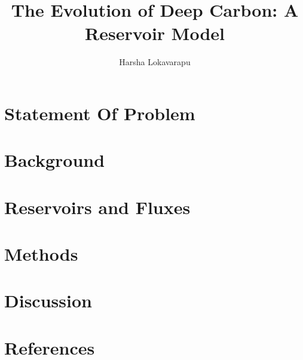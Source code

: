 \documentclass[review]{elsarticle}
\begin{document}
\begin{frontmatter}
\title{\textbf{The Evolution of Deep Carbon: A Reservoir Model}}
\address[address1]{Department of Earth and Planetary Sciences, University of California, Davis, CA 95616, USA}

\author[address1]{Harsha Lokavarapu }

\date{}
\begin{abstract}

\end{abstract}
\end{frontmatter}

\section{Statement Of Problem}


\section{Background}


\section{Reservoirs and Fluxes}


\section{Methods}


\section{Discussion}


\newpage
\section*{References}
 

\end{document}
